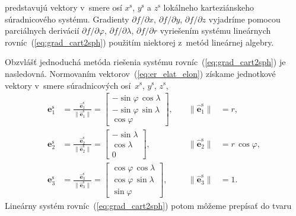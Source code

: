 \documentclass[a4paper,12pt]{book}
\let\vec\mathbf
\begin{document}
%
predstavujú vektory v~smere osí $x^{\mathrm{s}}$, $y^{\mathrm{s}}$ 
a $z^{\mathrm{s}}$ lokálneho karteziánskeho súradnicového systému.  Gradienty 
$\partial f \slash \partial x$, $\partial f \slash \partial y$, $\partial 
f \slash \partial z$ vyjadríme pomocou parciálnych derivácií $\partial f \slash 
\partial \varphi$, $\partial f \slash \partial \lambda$, $\partial f \slash 
\partial r$ vyriešením systému lineárnych rovníc~(\ref{eq:grad_cart2sph}) 
použitím niektorej z~metód lineárnej algebry.

Obzvlášť jednoduchá metóda riešenia systému rovníc~(\ref{eq:grad_cart2sph}) je 
nasledovná.  Normovaním vektorov~(\ref{eq:er_elat_elon}) získame jednotkové 
vektory v~smere súradnicových osí~$x^\mathrm{s}$, $y^\mathrm{s}$, 
$z^\mathrm{s}$,
%
\begin{equation}
\label{eq:er_elat_elon_unit}
\begin{aligned}
%
\vec e^\mathrm{s}_1 &= \frac{\hat{\vec e}_1^\mathrm{s}}{\| \hat{\vec 
e}_1^\mathrm{s} \|} = 
%
\begin{bmatrix}
-\sin\varphi \, \cos\lambda\\
-\sin\varphi \, \sin\lambda\\
\cos\varphi
\end{bmatrix}
%
{,} \quad &\| \hat{\vec e}_1^\mathrm{s} \| &= r{,}\\
%
\vec e^\mathrm{s}_2 &= \frac{\hat{\vec e}_2^\mathrm{s}}{\| \hat{\vec 
e}_2^\mathrm{s} \|} = 
%
\begin{bmatrix}
-\sin\lambda\\
\cos\lambda\\
0
\end{bmatrix}
%
{,}  \quad &\| \hat{\vec e}_2^\mathrm{s} \| &= r \, \cos\varphi{,}\\
%
\vec e^\mathrm{s}_3 &= \frac{\hat{\vec e}_3^\mathrm{s}}{\| \hat{\vec 
e}_3^\mathrm{s} \|} = 
%
\begin{bmatrix}
\cos\varphi \, \cos\lambda\\
\cos\varphi \, \sin\lambda\\
\sin\varphi
\end{bmatrix}
%
{,} \quad &\| \hat{\vec e}_3^\mathrm{s} \| &= 1{.}
%
\end{aligned}
\end{equation}
%
Lineárny systém rovníc~(\ref{eq:grad_cart2sph}) potom môžeme prepísať do tvaru
%
\end{document}
